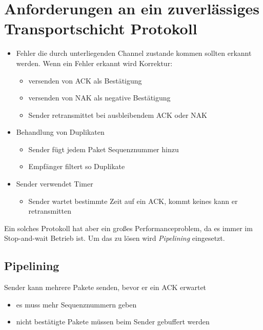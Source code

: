 \section{Anforderungen an ein zuverlässiges Transportschicht Protokoll}
\begin{itemize}
    \item Fehler die durch unterliegenden Channel zustande kommen sollten erkannt werden. Wenn ein Fehler erkannt wird Korrektur:
            \begin{itemize}
                \item versenden von ACK als Bestätigung 
                \item versenden von NAK als negative Bestätigung
                \item Sender retransmittet bei ausbleibendem ACK oder NAK
            \end{itemize}
    \item Behandlung von Duplikaten
            \begin{itemize}
                \item Sender fügt jedem Paket Sequenznummer hinzu
                \item Empfänger filtert so Duplikate
            \end{itemize}
    \item Sender verwendet Timer
            \begin{itemize}
                \item Sender wartet bestimmte Zeit auf ein ACK, kommt keines kann er retransmitten
            \end{itemize}
\end{itemize}
Ein solches Protokoll hat aber ein großes Performanceproblem, da es immer im Stop-and-wait Betrieb ist. Um das zu lösen wird \emph{Pipelining} eingesetzt.

\subsection{Pipelining}
Sender kann mehrere Pakete senden, bevor er ein ACK erwartet
\begin{itemize}
    \item es muss mehr Sequenznummern geben
    \item nicht bestätigte Pakete müssen beim Sender gebuffert werden
\end{itemize}

